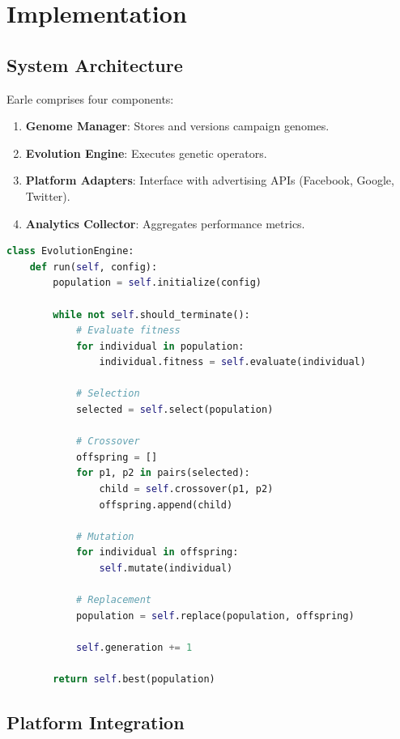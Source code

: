 \section{Implementation}


\subsection{System Architecture}

Earle comprises four components:

\begin{enumerate}
\item \textbf{Genome Manager}: Stores and versions campaign genomes.
\item \textbf{Evolution Engine}: Executes genetic operators.
\item \textbf{Platform Adapters}: Interface with advertising APIs (Facebook, Google, Twitter).
\item \textbf{Analytics Collector}: Aggregates performance metrics.
\end{enumerate}

\begin{lstlisting}[language=Python,caption=Evolution loop]
class EvolutionEngine:
    def run(self, config):
        population = self.initialize(config)

        while not self.should_terminate():
            # Evaluate fitness
            for individual in population:
                individual.fitness = self.evaluate(individual)

            # Selection
            selected = self.select(population)

            # Crossover
            offspring = []
            for p1, p2 in pairs(selected):
                child = self.crossover(p1, p2)
                offspring.append(child)

            # Mutation
            for individual in offspring:
                self.mutate(individual)

            # Replacement
            population = self.replace(population, offspring)

            self.generation += 1

        return self.best(population)
\end{lstlisting}

\subsection{Platform Integration}

